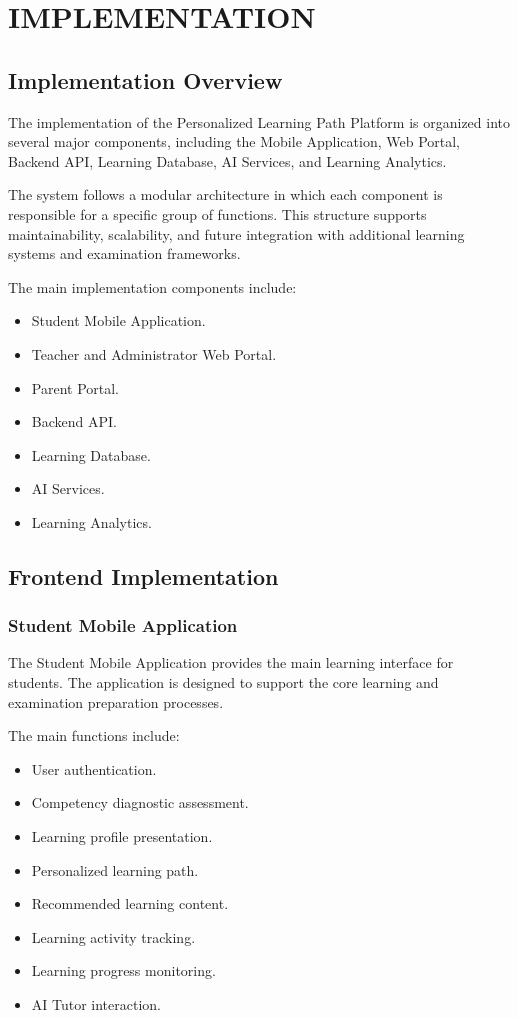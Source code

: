\chapter{IMPLEMENTATION}

\section{Implementation Overview}

The implementation of the Personalized Learning Path Platform is organized into several major components, including the Mobile Application, Web Portal, Backend API, Learning Database, AI Services, and Learning Analytics.

The system follows a modular architecture in which each component is responsible for a specific group of functions. This structure supports maintainability, scalability, and future integration with additional learning systems and examination frameworks.

The main implementation components include:

\begin{itemize}
	\item Student Mobile Application.
	\item Teacher and Administrator Web Portal.
	\item Parent Portal.
	\item Backend API.
	\item Learning Database.
	\item AI Services.
	\item Learning Analytics.
\end{itemize}

\section{Frontend Implementation}

\subsection{Student Mobile Application}

The Student Mobile Application provides the main learning interface for students. The application is designed to support the core learning and examination preparation processes.

The main functions include:

\begin{itemize}
	\item User authentication.
	\item Competency diagnostic assessment.
	\item Learning profile presentation.
	\item Personalized learning path.
	\item Recommended learning content.
	\item Learning activity tracking.
	\item Learning progress monitoring.
	\item AI Tutor interaction.
\end{itemize}

